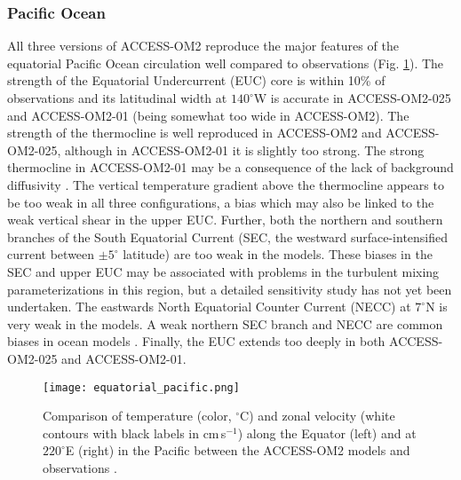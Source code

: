 \documentclass[gmd, manuscript]{copernicus}
\begin{document}
\subsubsection{Pacific Ocean}


All three versions of ACCESS-OM2 reproduce the major features of the equatorial Pacific Ocean circulation well compared to observations (Fig. \ref{fig:eqpac}). 
The strength of the Equatorial Undercurrent (EUC) core is within 10\% of observations and its latitudinal width at $140^\circ$W is accurate in ACCESS-OM2-025 and ACCESS-OM2-01 (being somewhat too wide in ACCESS-OM2). 
The strength of the thermocline is well reproduced in ACCESS-OM2 and ACCESS-OM2-025, although in ACCESS-OM2-01 it is slightly too strong. 
The strong thermocline in ACCESS-OM2-01 may be a consequence of the lack of background diffusivity \citep[e.g.][]{Meehl2001}. 
The vertical temperature gradient above the thermocline appears to be too weak in all three configurations, a bias which may also be linked to the weak vertical shear in the upper EUC.
Further, both the northern and southern branches of the South Equatorial Current (SEC, the westward surface-intensified current between $\pm5^\circ$ latitude) are too weak in the models.
These biases in the SEC and upper EUC may be associated with problems in the turbulent mixing parameterizations in this region, but a detailed sensitivity study has not yet been undertaken.
The eastwards North Equatorial Counter Current (NECC) at $7^\circ$N is very weak in the models. 
A weak northern SEC branch and NECC are common biases in ocean models \citep[e.g][]{Large2001,Tseng2016}.
Finally, the EUC extends too deeply in both ACCESS-OM2-025 and ACCESS-OM2-01.

\begin{figure}[t]
\texttt{[image: equatorial\_pacific.png]}
\caption{Comparison of temperature (color, $^\circ$C) and zonal velocity (white contours with black labels in cm\,s$^{-1}$) along the Equator (left) and at $220^\circ$E (right) in the Pacific between the ACCESS-OM2 models and observations \citep[][bottom two panels]{Johnson2002a}.
\label{fig:eqpac}}
\end{figure}
\end{document}
